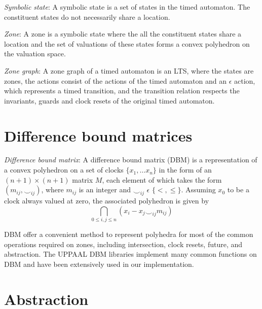 \documentclass[a4paper]{llncs}
\begin{document}
\begin{definition}
  \emph{Symbolic state}: A symbolic state is a set of states in
  the timed automaton. The constituent states do not necessarily share
  a location.
\end{definition}

\begin{definition}
  \emph{Zone}: A zone is a symbolic state where the all the
  constituent states share a location and the set of valuations of
  these states forms a convex polyhedron on the valuation space.
\end{definition}

\begin{definition}
  \emph{Zone graph}: A zone graph of a timed automaton is an LTS, where
  the states are zones, the actions consist of the actions of the
  timed automaton and an $\epsilon$ action, which represents a timed
  transition, and the transition relation respects the invariants,
  guards and clock resets of the original timed automaton.
\end{definition}

\section{Difference bound matrices}
\begin{definition}
  \emph{Difference bound matrix}: A difference bound matrix (DBM) is a
  representation of a convex polyhedron on a set of clocks $\{x_{1},
  \ldots x_{n}\}$ in the form of an $(n+1) \times (n+1)$
  matrix $M$, each element of which takes the form $(m_{ij}, \smile
  _{ij})$, where $m_{ij}$ is an integer and $\smile_{ij}$ $\epsilon$
  $\{ <, \leq\}$. Assuming $x_0$ to be a clock always valued at zero,
  the associated polyhedron is given by
  \begin{displaymath}
    \bigcap_{0 \leq i, j \leq n}(x_{i} - x_{j} \smile_{ij} m_{ij})
  \end{displaymath}
\end{definition}

DBM offer a convenient method to represent polyhedra for most of the
common operations required on zones, including intersection, clock
resets, future, and abstraction. The UPPAAL DBM libraries
\cite{david2006uppaal} implement many common functions on DBM and
have been extensively used in our implementation.

\section{Abstraction}
\end{document}

